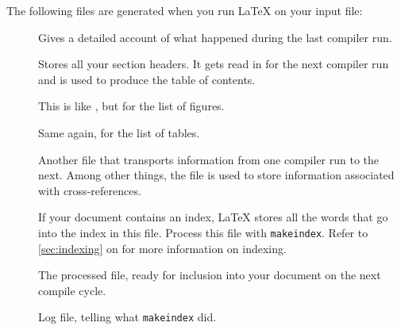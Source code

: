 The following files are generated when you run \LaTeX{} on your input
file:
\begin{description}
  \item[] Gives a detailed account of what happened during the
    last compiler run.
  \item[] Stores all your section headers. It gets read in for the
    next compiler run and is used to produce the table of contents.
  \item[] This is like , but for the list of figures.
  \item[] Same again, for the list of tables.
  \item[] Another file that transports information from one
    compiler run to the next. Among other things, the  file is used
    to store information associated with cross-references.
  \item[] If your document contains an index, \LaTeX{} stores all
    the words that go into the index in this file. Process this file with
    \texttt{makeindex}. Refer to \autoref{sec:indexing} on
     for more information on indexing.
  \item[] The processed  file, ready for inclusion into your
    document on the next compile cycle.
  \item[] Log file, telling what \texttt{makeindex} did.
\end{description}

